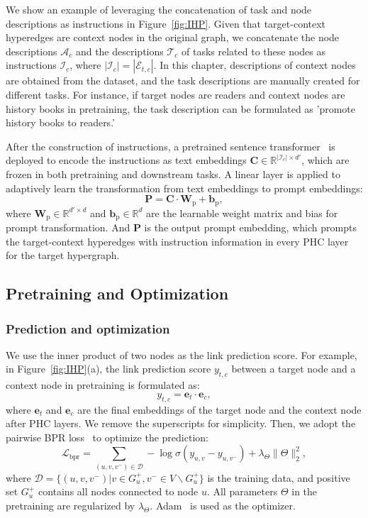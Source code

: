 We show an example of leveraging the concatenation of task and node descriptions as instructions in Figure~\ref{fig:IHP}. 
Given that target-context hyperedges are context nodes in the original graph, we concatenate the node descriptions $\mathcal{A}_c$ and the descriptions $\mathcal{T}_c$ of tasks related to these nodes as instructions $\mathcal{I}_c$, where $|\mathcal{I}_c|=|\mathcal{E}_{t,c}|$. 
In this chapter, descriptions of context nodes are obtained from the dataset, and the task descriptions are manually created for different tasks. 
For instance, if target nodes are readers and context nodes are history books in pretraining, the task description can be formulated as 'promote history books to readers.' 

After the construction of instructions, a pretrained sentence transformer~\cite{minilm} is deployed to encode the instructions as text embeddings $\mathbf{C}\in \mathbb{R}^{|\mathcal{I}_c|\times d'}$, which are frozen in both pretraining and downstream tasks. A linear layer is applied to adaptively learn the transformation from text embeddings to prompt embeddings:
\begin{equation}
    \mathbf{P}=\mathbf{C}\cdot\mathbf{W}_\text{p}+\mathbf{b}_\text{p},
\end{equation}
where $\mathbf{W}_\text{p}\in \mathbb{R}^{d'\times d}$ and $\mathbf{b}_\text{p}\in \mathbb{R}^d$ are the learnable weight matrix and bias for prompt transformation. And $\mathbf{P}$ is the output prompt embedding, which prompts the target-context hyperedges with instruction information in every PHC layer for the target hypergraph. 

\subsection{Pretraining and Optimization}
\subsubsection{Prediction and optimization}
We use the inner product of two nodes as the link prediction score. 
For example, in Figure~\ref{fig:IHP}(a), the link prediction score $y_{t,c}$ between a target node and a context node in pretraining is formulated as:
\begin{equation}
    y_{t,c}=\mathbf{e}_{t}\cdot\mathbf{e}_{c},
\end{equation}
where $\mathbf{e}_{t}$ and $\mathbf{e}_{c}$ are the final embeddings of the target node and the context node after PHC layers.
We remove the superscripts for simplicity.
Then, we adopt the pairwise BPR loss~\cite{BPR} to optimize the prediction:
\begin{equation}
    \mathcal{L}_{\text{bpr}}=\sum\limits_{(u,v,v^-)\in \mathcal{D}} -\log\sigma(y_{u,v}-y_{u,v^-}) + \lambda_\Theta\|\Theta\|^2_2,
\end{equation}
where $\mathcal{D}=\{(u,v,v^-)|v\in G^{+}_{u}, v^-\in V\backslash G^{+}_{u}\}$ is the training data, and positive set $G^{+}_{u}$ contains all nodes connected to node $u$.
All parameters $\Theta$ in the pretraining are regularized by $\lambda_\Theta$.
Adam~\cite{Adam} is used as the optimizer.

